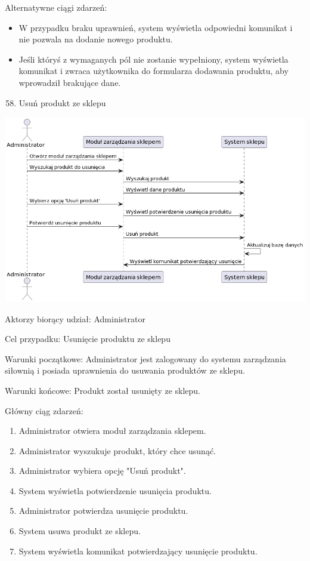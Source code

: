 \documentclass[
]{article}
\providecommand{\tightlist}{%
  \setlength{\itemsep}{0pt}\setlength{\parskip}{0pt}}
\begin{document}
{Alternatywne ciągi zdarzeń:}

\begin{itemize}
\tightlist
\item
  {W przypadku braku uprawnień, system wyświetla odpowiedni komunikat i
  nie pozwala na dodanie nowego produktu.}
\item
  {Jeśli któryś z wymaganych pól nie zostanie wypełniony, system
  wyświetla komunikat i zwraca użytkownika do formularza dodawania
  produktu, aby wprowadził brakujące dane.}
\end{itemize}

{}

\begin{enumerate}
\setcounter{enumi}{57}
\tightlist
\item
  {Usuń produkt ze sklepu}
\end{enumerate}

{\includegraphics{diagrams/sequence/sklep_usun_produkt_ze_sklepu.png}}

{Aktorzy biorący udział: Administrator}

{Cel przypadku: Usunięcie produktu ze sklepu}

{Warunki początkowe: Administrator jest zalogowany do systemu
zarządzania siłownią i posiada uprawnienia do usuwania produktów ze
sklepu.}

{Warunki końcowe: Produkt został usunięty ze sklepu.}

{Główny ciąg zdarzeń:}

\begin{enumerate}
\tightlist
\item
  {Administrator otwiera moduł zarządzania sklepem.}
\item
  {Administrator wyszukuje produkt, który chce usunąć.}
\item
  {Administrator wybiera opcję "Usuń produkt".}
\item
  {System wyświetla potwierdzenie usunięcia produktu.}
\item
  {Administrator potwierdza usunięcie produktu.}
\item
  {System usuwa produkt ze sklepu.}
\item
  {System wyświetla komunikat potwierdzający usunięcie produktu.}
\end{enumerate}
\end{document}
